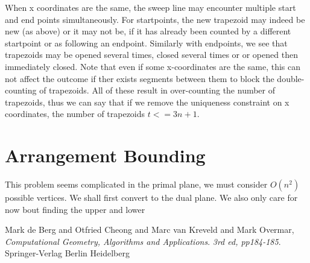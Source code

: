\documentclass{article}
\begin{document}
When x coordinates are the same, the sweep line may encounter multiple start and end points simultaneously.
For startpoints, the new trapezoid may indeed be new (as above) or it may not be, if it has already been counted by a different startpoint or as following an endpoint.
Similarly with endpoints, we see that trapezoids may be opened several times, closed several times or or opened then immediately closed.
Note that even if some x-coordinates are the same, this can  not affect the outcome if ther exists segments between them to block the double-counting of trapezoids.
All of these result in over-counting the number of trapezoids, thus we can say that if we remove the uniqueness constraint on x coordinates, the number of trapezoids $t <= 3n + 1$.

\section {Arrangement Bounding}

This problem seems complicated in the primal plane, we must consider $O(n^2)$ possible vertices.
We shall first convert to the dual plane.
We also only care for now bout finding the upper and lower

\begin{thebibliography}{9}

  Mark de Berg and Otfried Cheong and Marc van Kreveld and Mark Overmar,
  \emph{Computational Geometry, Algorithms and Applications}.
  \emph{3rd ed, pp184-185}.
  Springer-Verlag Berlin Heidelberg
  
\end{thebibliography}
\end{document}
